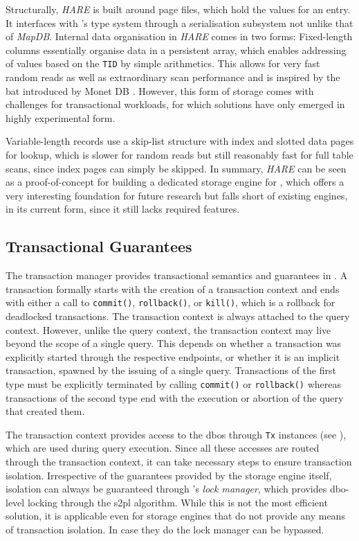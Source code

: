 Structurally, \emph{HARE} is built around page files, which hold the values for an entry. It interfaces with \cottontail{}'s type system through a serialisation subsystem not unlike that of \emph{MapDB}. Internal data organisation in \emph{HARE} comes in two forms: Fixed-length columns essentially organise data in a persistent array, which enables addressing of values based on the \texttt{TID} by simple arithmetics. This allows for very fast random reads as well as extraordinary scan performance and is inspired by the \acrshort{bat} introduced by Monet DB \cite{Idreos:2012MonetDB}. However, this form of storage comes with challenges for transactional workloads, for which solutions have only emerged in highly experimental form.

Variable-length records use a skip-list structure with index and slotted data pages for lookup, which is slower for random reads but still reasonably fast for full table scans, since index pages can simply be skipped. In summary, \emph{HARE} can be seen as a proof-of-concept for building a dedicated storage engine for \cottontail, which offers a very interesting foundation for future research but falls short of existing engines, in its current form, since it still lacks required features.

\subsection{Transactional Guarantees}
\label{section:cottontail_transaction_manager}
The transaction manager provides transactional semantics and guarantees in \cottontail. A transaction formally starts with the creation of a transaction context and ends with either a call to \texttt{commit()}, \texttt{rollback()}, or \texttt{kill()}, which is a rollback for deadlocked transactions. The transaction context is always attached to the query context. However, unlike the query context, the transaction context may live beyond the scope of a single query. This depends on whether a transaction was explicitly started through the respective endpoints, or whether it is an implicit transaction, spawned by the issuing of a single query. Transactions of the first type must be explicitly terminated by calling  \texttt{commit()} or \texttt{rollback()} whereas transactions of the second type end with the execution or abortion of the query that created them.

The transaction context provides access to the \acrshort{dbo}s through \texttt{Tx} instances (see ), which are used during query execution. Since all these accesses are routed through the transaction context, it can take necessary steps to ensure transaction isolation. Irrespective of the guarantees provided by the storage engine itself, isolation can always be guaranteed through \cottontail{}'s \emph{lock manager}, which provides \acrshort{dbo}-level locking through the \acrshort{s2pl} algorithm. While this is not the most efficient solution, it is applicable even for storage engines that do not provide any means of transaction isolation. In case they do the lock manager can be bypassed.

